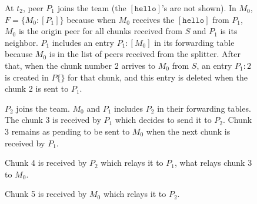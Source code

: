 \begin{figure}
   \caption{At $t_2$, peer $P_1$ joins
    the team (the $[\mathtt{hello}]$'s are not shown). In $M_0$,
    $F=\{M_0:[P_1]\}$ because when $M_0$ receives the
    $[\mathtt{hello}]$ from $P_1$, $M_0$ is the origin peer for all
    chunks received from $S$ and $P_1$ is its neighbor. $P_1$ includes
    an entry $P_1:[M_0]$ in its forwarding table because $M_0$ is in
    the list of peers received from the splitter. After that, when the
    chunk number 2 arrives to $M_0$ from $S$, an entry $P_1:2$ is
    created in $P\{\}$ for that chunk, and this entry is deleted when
    the chunk 2 is sent to $P_1$.\label{fig:team_1}}
\end{figure}

\begin{figure}
   \caption{$P_2$ joins the team. $M_0$
    and $P_1$ includes $P_2$ in their forwarding tables. The chunk 3
    is received by $P_1$ which decides to send it to $P_2$. Chunk 3
    remains as pending to be sent to $M_0$ when the next chunk is
    received by $P_1$. \label{fig:team_2}}
\end{figure}
    
\begin{figure}
   \caption{Chunk 4 is received by $P_2$ which
    relays it to $P_1$, what relays chunk 3 to
    $M_0$.\label{fig:team_3}}
\end{figure}

\begin{figure}
   \caption{Chunk 5 is received by $M_0$ which
    relays it to $P_2$.\label{fig:team_4}}
\end{figure}

